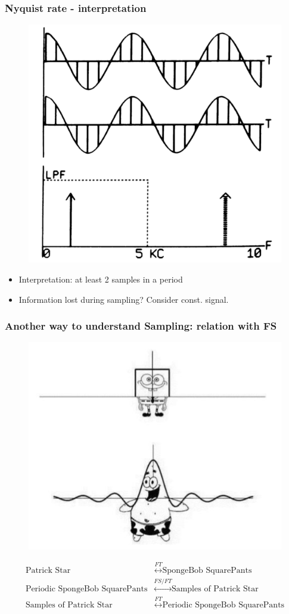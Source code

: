 \documentclass{beamer}
\begin{document}
\begin{frame}
    \frametitle{Nyquist rate - interpretation}
    \begin{figure}
    \includegraphics[width=0.5\linewidth]{cos_sample}
    \end{figure}
\begin{itemize}
    \item Interpretation: at least 2 samples in a period
    \item Information lost during sampling? Consider const. signal.
\end{itemize}
\end{frame}



\begin{frame}[t]
    \frametitle{Another way to understand Sampling: relation with FS}
    \begin{figure}
        \includegraphics[width=0.4\linewidth]{sponge.PNG}
    \end{figure}
    \begin{center}
        \begin{align*}
            \text{Patrick Star} &\stackrel{FT}{\longleftrightarrow}  \text{SpongeBob SquarePants} \\[0.5em]
            \text{Periodic SpongeBob SquarePants} &\stackrel{FS / FT}{\longleftrightarrow}  \text{Samples of Patrick Star} \\[0.5em]  
            \text{Samples of Patrick Star } &\stackrel{FT}{\longleftrightarrow}  \text{Periodic SpongeBob SquarePants}       
        \end{align*}
    \end{center} 
\end{frame}
\end{document}
